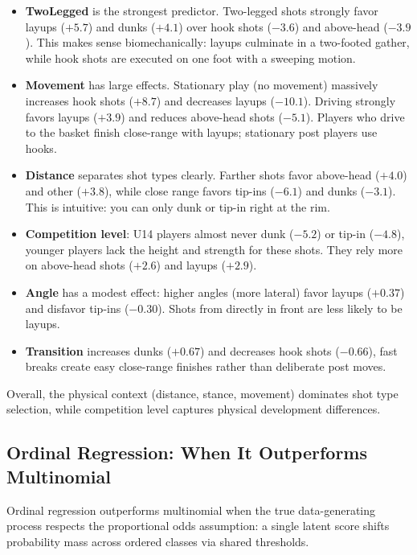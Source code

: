 \documentclass[10pt, a4paper]{article}
\begin{document}
\begin{itemize}

\item \textbf{TwoLegged} is the strongest predictor. Two-legged shots strongly favor layups ($+5.7$) and dunks ($+4.1$) over hook shots ($-3.6$) and above-head ($-3.9$). This makes sense biomechanically: layups culminate in a two-footed gather, while hook shots are executed on one foot with a sweeping motion.

\item \textbf{Movement} has large effects. Stationary play (no movement) massively increases hook shots ($+8.7$) and decreases layups ($-10.1$). Driving strongly favors layups ($+3.9$) and reduces above-head shots ($-5.1$). Players who drive to the basket finish close-range with layups; stationary post players use hooks.

\item \textbf{Distance} separates shot types clearly. Farther shots favor above-head ($+4.0$) and other ($+3.8$), while close range favors tip-ins ($-6.1$) and dunks ($-3.1$). This is intuitive: you can only dunk or tip-in right at the rim.

\item \textbf{Competition level}: U14 players almost never dunk ($-5.2$) or tip-in ($-4.8$), younger players lack the height and strength for these shots. They rely more on above-head shots ($+2.6$) and layups ($+2.9$).

\item \textbf{Angle} has a modest effect: higher angles (more lateral) favor layups ($+0.37$) and disfavor tip-ins ($-0.30$). Shots from directly in front are less likely to be layups.

\item \textbf{Transition} increases dunks ($+0.67$) and decreases hook shots ($-0.66$), fast breaks create easy close-range finishes rather than deliberate post moves.

\end{itemize}

Overall, the physical context (distance, stance, movement) dominates shot type selection, while competition level captures physical development differences.

\subsection{Ordinal Regression: When It Outperforms Multinomial}

Ordinal regression outperforms multinomial when the true data-generating process respects the proportional odds assumption: a single latent score shifts probability mass across ordered classes via shared thresholds.
\end{document}
